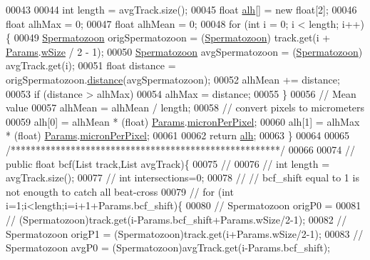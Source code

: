 \begin{DoxyCode}
00043 
00044     \textcolor{keywordtype}{int} length = avgTrack.size();
00045     \textcolor{keywordtype}{float} \hyperlink{classfunctions_1_1_kinematics_a8f8221f314e814927fb192ea65f2af4a}{alh}[] = \textcolor{keyword}{new} \textcolor{keywordtype}{float}[2];
00046     \textcolor{keywordtype}{float} alhMax = 0;
00047     \textcolor{keywordtype}{float} alhMean = 0;
00048     \textcolor{keywordflow}{for} (\textcolor{keywordtype}{int} i = 0; i < length; i++) \{
00049       \hyperlink{classdata_1_1_spermatozoon}{Spermatozoon} origSpermatozoon = (\hyperlink{classdata_1_1_spermatozoon}{Spermatozoon}) track.get(i + 
      \hyperlink{classdata_1_1_params}{Params}.\hyperlink{classdata_1_1_params_ad1b7844e5f66ee81c3de06d1a8ca645e}{wSize} / 2 - 1);
00050       \hyperlink{classdata_1_1_spermatozoon}{Spermatozoon} avgSpermatozoon = (\hyperlink{classdata_1_1_spermatozoon}{Spermatozoon}) avgTrack.get(i);
00051       \textcolor{keywordtype}{float} distance = origSpermatozoon.\hyperlink{classdata_1_1_spermatozoon_aaef7a8e7602a08c82ea5fcbb777883e0}{distance}(avgSpermatozoon);
00052       alhMean += distance;
00053       \textcolor{keywordflow}{if} (distance > alhMax)
00054         alhMax = distance;
00055     \}
00056     \textcolor{comment}{// Mean value}
00057     alhMean = alhMean / length;
00058     \textcolor{comment}{// convert pixels to micrometers}
00059     alh[0] = alhMean * (float) \hyperlink{classdata_1_1_params}{Params}.\hyperlink{classdata_1_1_params_a19331ee97ef3c422984fc7dff976549e}{micronPerPixel};
00060     alh[1] = alhMax * (\textcolor{keywordtype}{float}) \hyperlink{classdata_1_1_params}{Params}.\hyperlink{classdata_1_1_params_a19331ee97ef3c422984fc7dff976549e}{micronPerPixel};
00061 
00062     \textcolor{keywordflow}{return} \hyperlink{classfunctions_1_1_kinematics_a8f8221f314e814927fb192ea65f2af4a}{alh};
00063   \}
00064 
00065   \textcolor{comment}{/******************************************************/}
00066 
00074   \textcolor{comment}{// public float bcf(List track,List avgTrack)\{}
00075   \textcolor{comment}{//}
00076   \textcolor{comment}{// int length = avgTrack.size();}
00077   \textcolor{comment}{// int intersections=0;}
00078   \textcolor{comment}{// // bcf\_shift equal to 1 is not enougth to catch all beat-cross}
00079   \textcolor{comment}{// for (int i=1;i<length;i=i+1+Params.bcf\_shift)\{}
00080   \textcolor{comment}{// Spermatozoon origP0 =}
00081   \textcolor{comment}{// (Spermatozoon)track.get(i-Params.bcf\_shift+Params.wSize/2-1);}
00082   \textcolor{comment}{// Spermatozoon origP1 = (Spermatozoon)track.get(i+Params.wSize/2-1);}
00083   \textcolor{comment}{// Spermatozoon avgP0 = (Spermatozoon)avgTrack.get(i-Params.bcf\_shift);}

\end{DoxyCode}
